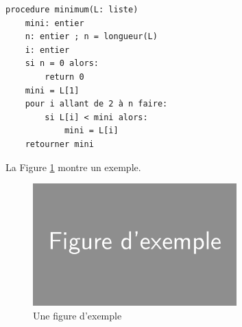 \begin{lstlisting}[language=Pseudo-code, caption=Recherche du minimum dans une liste]
procedure minimum(L: liste)
	mini: entier
	n: entier ; n = longueur(L)
	i: entier
	si n = 0 alors:
		return 0
	mini = L[1]
	pour i allant de 2 à n faire:
		si L[i] < mini alors:
			mini = L[i]
	retourner mini
\end{lstlisting}

\lipsum[3]

\vspace{1em}

La Figure \ref{exemple} montre un exemple.

\begin{figure}[H]
\centering
\includegraphics[width=0.7\textwidth]{images/figure_dexemple.png}
\caption{Une figure d'exemple}
\label{exemple}
\end{figure}

\lipsum[4]
\lipsum[5]

\vspace{1em}

\lipsum[6]

